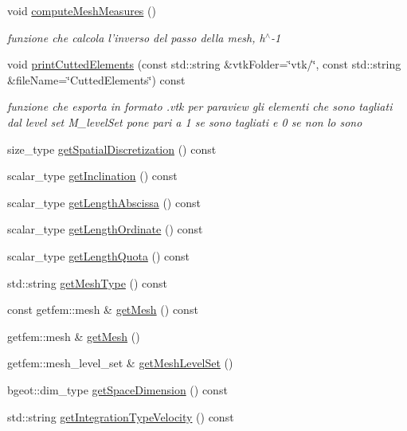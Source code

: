 \begin{DoxyCompactItemize}
void \hyperlink{classMeshHandler_a9d273c3ff67bed747b4a35bf24d96b41}{compute\-Mesh\-Measures} ()
\begin{DoxyCompactList}\small\item\em funzione che calcola l'inverso del passo della mesh, h$^\wedge$-\/1 \end{DoxyCompactList}\item 
void \hyperlink{classMeshHandler_adf082b93f71c001f6f1252dd269ae8fa}{print\-Cutted\-Elements} (const std\-::string \&vtk\-Folder=\char`\"{}vtk/\char`\"{}, const std\-::string \&file\-Name=\char`\"{}Cutted\-Elements\char`\"{}) const 
\begin{DoxyCompactList}\small\item\em funzione che esporta in formato .vtk per paraview gli elementi che sono tagliati dal level set M\-\_\-level\-Set pone pari a 1 se sono tagliati e 0 se non lo sono \end{DoxyCompactList}\item 
size\-\_\-type \hyperlink{classMeshHandler_af0c391bcac1ee103838b78d540b2b326}{get\-Spatial\-Discretization} () const 
\item 
scalar\-\_\-type \hyperlink{classMeshHandler_a664d02d7ec6352339c90457c8106b92e}{get\-Inclination} () const 
\item 
scalar\-\_\-type \hyperlink{classMeshHandler_a7eae9c85043ed3a26605dce2b1f3d6d2}{get\-Length\-Abscissa} () const 
\item 
scalar\-\_\-type \hyperlink{classMeshHandler_a6935edc0af8e28979b2c294daa6e789e}{get\-Length\-Ordinate} () const 
\item 
scalar\-\_\-type \hyperlink{classMeshHandler_a924c3c0d8020cc76bbc2773b634a3ed1}{get\-Length\-Quota} () const 
\item 
std\-::string \hyperlink{classMeshHandler_aec42b571d6dec518833c5264e2e43830}{get\-Mesh\-Type} () const 
\item 
const getfem\-::mesh \& \hyperlink{classMeshHandler_ac2dba1bdf2c6c3f574de03f2cdd6f78d}{get\-Mesh} () const 
\item 
getfem\-::mesh \& \hyperlink{classMeshHandler_a8739e6e0ce82793e93a70b8a23bbc634}{get\-Mesh} ()
\item 
getfem\-::mesh\-\_\-level\-\_\-set \& \hyperlink{classMeshHandler_a8e4ede201bd0e5fa83ec7b7a42f2befa}{get\-Mesh\-Level\-Set} ()
\item 
bgeot\-::dim\-\_\-type \hyperlink{classMeshHandler_a804b1168383f92f35f3c472f7ec58861}{get\-Space\-Dimension} () const 
\item 
std\-::string \hyperlink{classMeshHandler_ac9def34ac3cf1939389a6af08fd92111}{get\-Integration\-Type\-Velocity} () const 

\end{DoxyCompactItemize}
